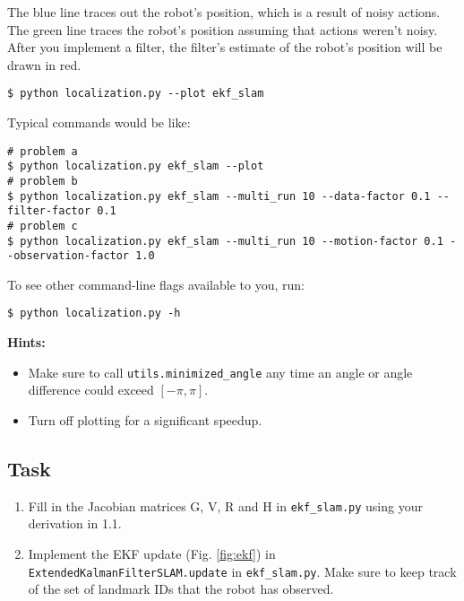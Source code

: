 \documentclass{article}
\begin{document}
The blue line traces out the robot's position, which is a result of noisy actions. The green line traces the robot's position assuming that actions weren't noisy. After you implement a filter, the filter's estimate of the robot's position will be drawn in red.

\begin{verbatim}
$ python localization.py --plot ekf_slam
\end{verbatim}

Typical commands would be like:

\begin{verbatim}
# problem a
$ python localization.py ekf_slam --plot
# problem b
$ python localization.py ekf_slam --multi_run 10 --data-factor 0.1 --filter-factor 0.1
# problem c
$ python localization.py ekf_slam --multi_run 10 --motion-factor 0.1 --observation-factor 1.0
\end{verbatim}

To see other command-line flags available to you, run:

\begin{verbatim}
$ python localization.py -h
\end{verbatim}

\textbf{Hints:}
\begin{itemize}
    \item Make sure to call \texttt{utils.minimized\_angle} any time an angle or angle difference could exceed $[-\pi,\pi]$.
    \item Turn off plotting for a significant speedup.
\end{itemize}

\subsection*{Task}
\begin{enumerate}
    \item Fill in the Jacobian matrices G, V, R and H in \texttt{ekf\_slam.py} using your derivation in 1.1.
    \item Implement the EKF update (Fig. \ref{fig:ekf}) in \texttt{ExtendedKalmanFilterSLAM.update} in \texttt{ekf\_slam.py}. Make sure to keep track of the set of landmark IDs that the robot has observed.
\end{enumerate}
\end{document}
